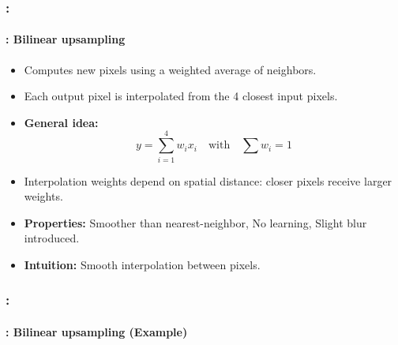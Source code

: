 \documentclass[xcolor=table]{beamer}
\begin{document}
\begin{frame}
	\frametitle{\insertshortsubtitle: \insertsection}
	\framesubtitle{\insertsubsection: Bilinear upsampling}
	
	\begin{itemize}
		
		\item Computes new pixels using a weighted average of neighbors.
		
		\item Each output pixel is interpolated from the 4 closest input pixels.
		
		\item \textbf{General idea:}
		\[
		y = \sum_{i=1}^{4} w_i x_i
		\quad \text{with} \quad \sum w_i = 1
		\]
		
		\item Interpolation weights depend on spatial distance: closer pixels receive larger weights.
		
		\item \textbf{Properties:} Smoother than nearest-neighbor, No learning, Slight blur introduced.
		\item \textbf{Intuition:} Smooth interpolation between pixels.
		
	\end{itemize}
	
\end{frame}

\begin{frame}
	\frametitle{\insertshortsubtitle: \insertsection}
	\framesubtitle{\insertsubsection: Bilinear upsampling (Example)}
	
	\begin{center}
		
		
	\end{center}
	
\end{frame}
\end{document}
